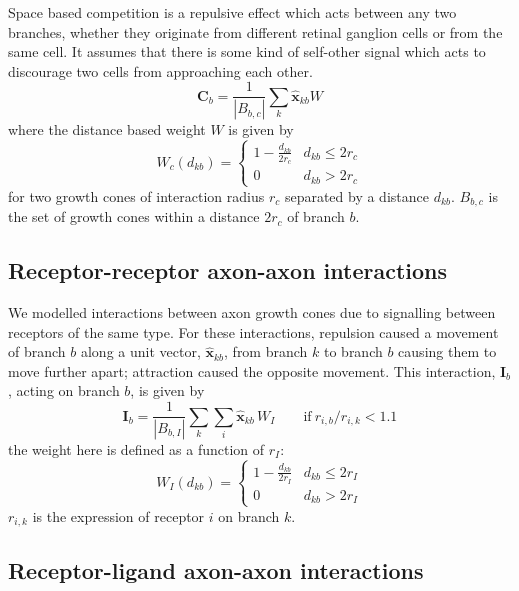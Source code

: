 \documentclass[11pt, a4paper]{article}
\begin{document}
Space based competition is a repulsive effect which acts between any two
branches, whether they originate from different retinal ganglion cells or from
the same cell. It assumes that there is some kind of self-other signal which
acts to discourage two cells from approaching each other.
%
\begin{equation}
\mathbf{C}_b = \frac{1}{|B_{b,c}|} \sum_k \hat{\mathbf{x}}_{kb} W
\end{equation}
where the distance based weight $W$ is given by
\begin{equation}
W_c(d_{kb}) = \begin{cases}
      1 - \frac{d_{kb}}{2r_c}   & d_{kb} \leq 2r_c \\
     0 & d_{kb} > 2r_c
     \end{cases}
\end{equation}
for two growth cones of interaction radius $r_c$ separated by a distance
$d_{kb}$. $B_{b,c}$ is the set of growth cones within a distance $2r_c$ of
branch $b$.

\subsection*{Receptor-receptor axon-axon interactions}

We modelled interactions between axon growth cones due to signalling between
receptors of the same type. For these interactions, repulsion caused a
movement of branch $b$ along a unit vector, $\hat{\mathbf{x}}_{kb}$, from
branch $k$ to branch $b$ causing them to move further apart; attraction caused
the opposite movement. This interaction, $\mathbf{I}_b$, acting on branch $b$,
is given by
%
\begin{equation}
\mathbf{I}_b
= \frac{1}{|B_{b,I}|} \sum_k \sum_i \hat{\mathbf{x}}_{kb}\,W_I \qquad \mathrm{if}~r_{i,b}
/ r_{i,k} < 1.1
\end{equation}
%
the weight here is defined as a function of $r_I$:
%
\begin{equation}
W_I(d_{kb}) = \begin{cases}
      1 - \frac{d_{kb}}{2r_I}   & d_{kb} \leq 2r_I \\
     0 & d_{kb} > 2r_I
     \end{cases}
\end{equation}
$r_{i,k}$ is the expression of receptor $i$ on branch $k$.

\subsection*{Receptor-ligand axon-axon interactions}
\end{document}
